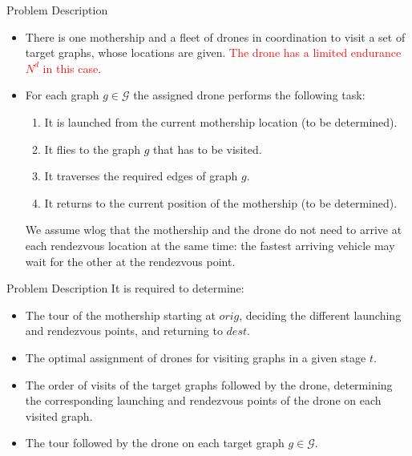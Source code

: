 \documentclass[slidestop,usepdftitle=false,10pt]{beamer}
\begin{document}
	\begin{frame}{Problem Description}
	\begin{itemize}
	    \item There is one mothership and a fleet of drones in coordination to visit a set of target graphs, whose locations are given. \textcolor{red}{The drone has a limited endurance $N^d$ in this case}.
	    \item For each graph $g\in\mathcal G$ the assigned drone performs the following task:
	    \begin{enumerate}
	        \item It is launched from the current mothership location (to be determined).
	        \item It flies to the graph $g$ that has to be visited.
	        \item It traverses the required edges of graph $g$.
	        \item It returns to the current position of the mothership (to be determined).
	    \end{enumerate}
	    We assume wlog that the mothership and the drone do not need to arrive at each rendezvous location at the same time: the fastest arriving vehicle may wait for the other at the rendezvous point.
	\end{itemize}
	\end{frame}
	
	\begin{frame}{Problem Description}
	It is required to determine:
	    \begin{itemize}
	        \item The tour of the mothership starting at $orig$, deciding the different launching and rendezvous points, and returning to $dest$.
	        \item The optimal assignment of drones for visiting graphs in a given stage $t$.
	        \item The order of visits of the target graphs followed by the drone, determining the corresponding launching and rendezvous points of the drone on each visited graph.
	        \item The tour followed by the drone on each target graph $g \in \mathcal{G}$.
	    \end{itemize}
	\end{frame}
	
\end{document}
